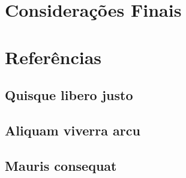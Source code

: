 \documentclass[
	12pt,				%
    oneside,            %
	a4paper,			%
	english,			%
	brazilian,		    %
	]{AcademicoUFT}
\begin{document}
\chapter*[Considerações Finais]{Considerações Finais}
\lipsum[150] %


\postextual


\chapter*{Referências}                                               %
\printbibliography[heading=none]                                     %


\begin{apendicesenv}
\partapendices %

\chapter{Quisque libero justo}

\section{Aliquam viverra arcu}
\lipsum[140] %

\section{Mauris consequat}
\lipsum[120] %
\end{apendicesenv}
\end{document}
